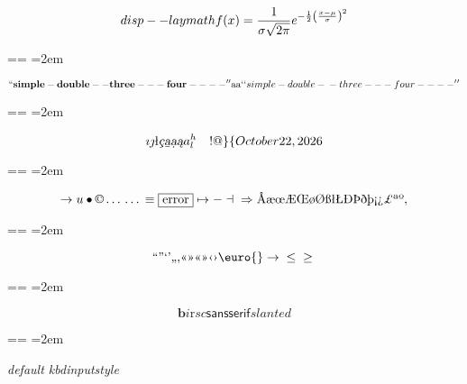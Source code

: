 \documentclass{book}
\makeatletter
\newenvironment{GNUTexinfopreformatted}{%
  \par\obeylines\obeyspaces\frenchspacing
  \parskip=\z@\parindent=\z@}{}
\makeatother
\begin{document}
$$
disp--laymath
f(x) = {1 \over \sigma \sqrt{2\pi}}e^{-{1 \over 2}\left({x-\mu \over \sigma}\right)^2}
$$
\begin{GNUTexinfopreformatted}
\leftskip=2em\relax\ttfamily%

\end{GNUTexinfopreformatted}
$$
\mathbf{``simple-double--three---four----''} \hbox{aa}
`\hbox{}`simple-double-\hbox{}-three---four----'\hbox{}'
$$
\begin{GNUTexinfopreformatted}
\leftskip=2em\relax\ttfamily%

\end{GNUTexinfopreformatted}
$$
\imath{} \jmath{}
\mathord{\text{\l{}}} \textsl{\c{c}}
\textsl{\b{a}} \textsl{\d{a}} \textsl{\k{a}} a^{h}_{l}
 \ {}\ {} \ {}\-{}  ! @ \} \{ 
\today{}
$$
\begin{GNUTexinfopreformatted}
\leftskip=2em\relax\ttfamily%

\end{GNUTexinfopreformatted}
$$
\rightarrow{}
u
\bullet{} \copyright{} \dots{} \dots{} \equiv{}
\fbox{error} \mapsto{} - \dashv{} \Rightarrow{}
\mathord{\text{\AA{}}} \mathord{\text{\ae{}}} \mathord{\text{\oe{}}} \mathord{\text{\AE{}}} \mathord{\text{\OE{}}} \mathord{\text{\o{}}} \mathord{\text{\O{}}} \mathord{\text{\ss{}}} \mathord{\text{\l{}}} \mathord{\text{\L{}}} \mathord{\text{\DH{}}}
\mathord{\text{\TH{}}} \mathord{\text{\dh{}}} \mathord{\text{\th{}}} \mathord{\text{\textexclamdown{}}} \mathord{\text{\textquestiondown{}}} \mathsterling{}
\mathord{\text{\textordfeminine{}}} \mathord{\text{\textordmasculine{}}} , 
$$
\begin{GNUTexinfopreformatted}
\leftskip=2em\relax\ttfamily%

\end{GNUTexinfopreformatted}
$$
\mathord{\text{\textquotedblleft{}}} \mathord{\text{\textquotedblright{}}} 
\mathord{\text{\textquoteleft{}}} \mathord{\text{\textquoteright{}}} \mathord{\text{\quotedblbase{}}} \mathord{\text{\quotesinglbase{}}} \mathord{\text{\guillemotleft{}}}
\mathord{\text{\guillemotright{}}} \mathord{\text{\guillemotleft{}}} \mathord{\text{\guillemotright{}}} \mathord{\text{\guilsinglleft{}}}
\mathord{\text{\guilsinglright{}}} \euro{} \rightarrow{} \leq{} \geq{}
$$
\begin{GNUTexinfopreformatted}
\leftskip=2em\relax\ttfamily%

\end{GNUTexinfopreformatted}
$$
\mathbf{b} \mathit{i} \mathrm{r} sc \mathsf{sansserif} slanted
$$
\begin{GNUTexinfopreformatted}
\leftskip=2em\relax\ttfamily%

{\ttfamily\textsl{default kbdinputstyle}}
\end{GNUTexinfopreformatted}
\end{document}
